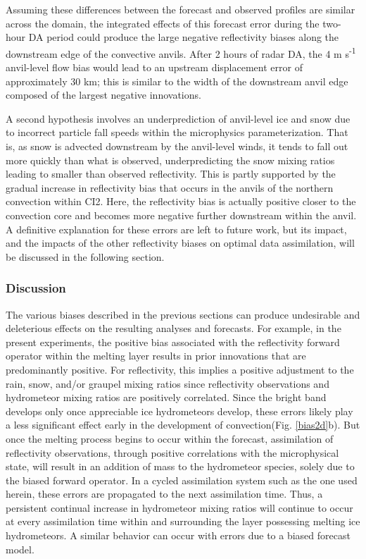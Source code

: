 Assuming these differences between the forecast and observed profiles are similar across the domain, the integrated effects of this forecast error during the two-hour DA period could produce the large negative reflectivity biases along the downstream edge of the convective anvils. After 2 hours of radar DA, the 4 m s\textsuperscript{-1} anvil-level flow bias would lead to an upstream displacement error of approximately 30 km; this is similar to the width of the downstream anvil edge composed of the largest negative innovations.

A second hypothesis involves an underprediction of anvil-level ice and snow due to incorrect particle fall speeds within the microphysics parameterization. That is, as snow is advected downstream by the anvil-level winds, it tends to fall out more quickly than what is observed, underpredicting the snow mixing ratios leading to smaller than observed reflectivity. This is partly supported by the gradual increase in reflectivity bias that occurs in the anvils of the northern convection within CI2. Here, the reflectivity bias is actually positive closer to the convection core and becomes more negative further downstream within the anvil. A definitive explanation for these errors are left to future work, but its impact, and the impacts of the other reflectivity biases on optimal data assimilation, will be discussed in the following section.

\subsubsection{Discussion}
The various biases described in the previous sections can produce undesirable and deleterious effects on the resulting analyses and forecasts. For example, in the present experiments, the positive bias associated with the reflectivity forward operator within the melting layer results in prior innovations that are predominantly positive. For reflectivity, this implies a positive adjustment to the rain, snow, and/or graupel mixing ratios since reflectivity observations and hydrometeor mixing ratios are positively correlated. Since the bright band develops only once appreciable ice hydrometeors develop, these errors likely play a less significant effect early in the development of convection(Fig. \ref{bias2d}b). But once the melting process begins to occur within the forecast, assimilation of reflectivity observations, through positive correlations with the microphysical state, will result in an addition of mass to the hydrometeor species, solely due to the biased forward operator. In a cycled assimilation system such as the one used herein, these errors are propagated to the next assimilation time. Thus, a persistent continual increase in hydrometeor mixing ratios will continue to occur at every assimilation time within and surrounding the layer possessing melting ice hydrometeors. A similar behavior can occur with errors due to a biased forecast model.

